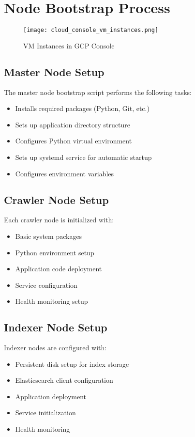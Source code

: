 \documentclass[12pt,a4paper]{report}
\begin{document}
\section{Node Bootstrap Process}
\begin{figure}[htb!]
    \centering
    \texttt{[image: cloud\_console\_vm\_instances.png]}
    \caption{VM Instances in GCP Console}
    \label{fig:vm-instances}
\end{figure}

\subsection{Master Node Setup}
The master node bootstrap script performs the following tasks:
\begin{itemize}
\item Installs required packages (Python, Git, etc.)
\item Sets up application directory structure
\item Configures Python virtual environment
\item Sets up systemd service for automatic startup
\item Configures environment variables
\end{itemize}

\subsection{Crawler Node Setup}
Each crawler node is initialized with:
\begin{itemize}
\item Basic system packages
\item Python environment setup
\item Application code deployment
\item Service configuration
\item Health monitoring setup
\end{itemize}

\subsection{Indexer Node Setup}
Indexer nodes are configured with:
\begin{itemize}
\item Persistent disk setup for index storage
\item Elasticsearch client configuration
\item Application deployment
\item Service initialization
\item Health monitoring
\end{itemize}
\end{document}
